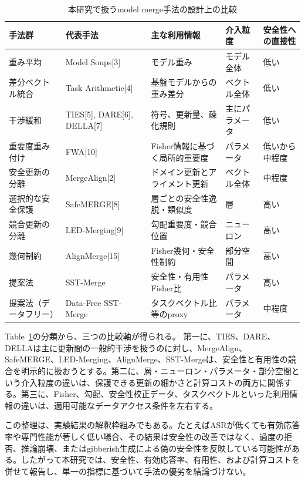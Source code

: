 \documentclass{article}
\begin{document}
\begin{table}[t]
\centering
\caption{本研究で扱うmodel merge手法の設計上の比較}
\label{tab:method-comparison-revised}
\small
\begin{tabular}{p{2.3cm}p{2.7cm}p{3.0cm}p{2.0cm}p{2.6cm}}
\toprule
手法群 & 代表手法 & 主な利用情報 & 介入粒度 & 安全性への直接性 \\
\midrule
重み平均 &
Model Soups[3] &
モデル重み &
モデル全体 &
低い \\
差分ベクトル統合 &
Task Arithmetic[4] &
基盤モデルからの重み差分 &
ベクトル全体 &
低い \\
干渉緩和 &
TIES[5], DARE[6], DELLA[7] &
符号、更新量、疎化規則 &
主にパラメータ &
低い \\
重要度重み付け &
FWA[10] &
Fisher情報に基づく局所的重要度 &
パラメータ &
低いから中程度 \\
安全更新の分離 &
MergeAlign[2] &
ドメイン更新とアライメント更新 &
ベクトル全体 &
中程度 \\
選択的な安全保護 &
SafeMERGE[8] &
層ごとの安全性逸脱・類似度 &
層 &
高い \\
競合更新の分離 &
LED-Merging[9] &
勾配重要度・競合位置 &
ニューロン &
高い \\
幾何制約 &
AlignMerge[15] &
Fisher幾何・安全性制約 &
部分空間 &
高い \\
提案法 &
SST-Merge &
安全性・有用性Fisher比 &
パラメータ &
高い \\
提案法（データフリー） &
Data-Free SST-Merge &
タスクベクトル比等のproxy &
パラメータ &
中程度 \\
\bottomrule
\end{tabular}
\end{table}

Table~\ref{tab:method-comparison-revised}の分類から、三つの比較軸が得られる。
第一に、TIES、DARE、DELLAは主に更新間の一般的干渉を扱うのに対し、MergeAlign、SafeMERGE、LED-Merging、AlignMerge、SST-Mergeは、安全性と有用性の競合を明示的に扱おうとする。第二に、層・ニューロン・パラメータ・部分空間という介入粒度の違いは、保護できる更新の細かさと計算コストの両方に関係する。第三に、Fisher、勾配、安全性校正データ、タスクベクトルといった利用情報の違いは、適用可能なデータアクセス条件を左右する。

この整理は、実験結果の解釈枠組みでもある。たとえばASRが低くても有効応答率や専門性能が著しく低い場合、その結果は安全性の改善ではなく、過度の拒否、推論崩壊、またはgibberish生成による偽の安全性を反映している可能性がある。したがって本研究では、安全性、有効応答率、有用性、および計算コストを併せて報告し、単一の指標に基づいて手法の優劣を結論づけない。
\end{document}
